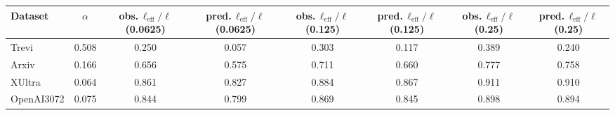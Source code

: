 \begin{tabular}{@{}lccccccc@{}}
\toprule
Dataset & $\alpha$ & obs.\,$\ell_{\mathrm{eff}}/\ell$ (0.0625) & pred.\,$\ell_{\mathrm{eff}}/\ell$ (0.0625) & obs.\,$\ell_{\mathrm{eff}}/\ell$ (0.125) & pred.\,$\ell_{\mathrm{eff}}/\ell$ (0.125) & obs.\,$\ell_{\mathrm{eff}}/\ell$ (0.25) & pred.\,$\ell_{\mathrm{eff}}/\ell$ (0.25) \\
\midrule
Trevi & 0.508 & 0.250 & 0.057 & 0.303 & 0.117 & 0.389 & 0.240 \\
Arxiv & 0.166 & 0.656 & 0.575 & 0.711 & 0.660 & 0.777 & 0.758 \\
XUltra & 0.064 & 0.861 & 0.827 & 0.884 & 0.867 & 0.911 & 0.910 \\
OpenAI3072 & 0.075 & 0.844 & 0.799 & 0.869 & 0.845 & 0.898 & 0.894 \\
\bottomrule
\end{tabular}
